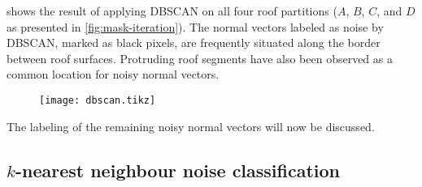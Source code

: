  shows the result of applying DBSCAN on all four roof partitions ($A$, $B$, $C$, and $D$ as presented in \cref{fig:mask-iteration}).
The normal vectors labeled as noise by DBSCAN, marked as black pixels, are frequently situated along the border between roof surfaces.
Protruding roof segments have also been observed as a common location for noisy normal vectors.
\begin{figure}[H]
  \centering
  \texttt{[image: dbscan.tikz]}
  \label{fig:dbscan-tile}
\end{figure}
\noindent
The labeling of the remaining noisy normal vectors will now be discussed.

\subsection{\texorpdfstring{$k$}{k}-nearest neighbour noise classification}


